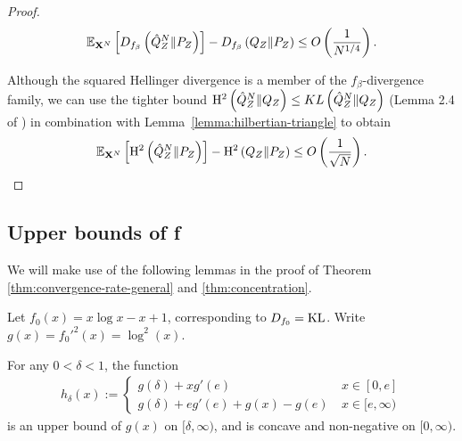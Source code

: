\begin{proof}
\begin{align*}
    \mathbb{E}_{\mathbf{X}^N}\left[D_{f_\beta}\left( \hat{Q}^N_Z \| P_Z\right)\right] - D_{f_\beta}\left( Q_{Z} \| P_Z\right) \leq O\left(\frac{1}{N^{1/4}}\right).
\end{align*}

Although the squared Hellinger divergence is a member of the $f_\beta$-divergence family, we can use the tighter bound $\mathrm{H}^2\left( \hat{Q}^N_Z \| Q_Z\right) \leq KL\left( \hat{Q}^N_Z \| Q_Z\right)$ (Lemma 2.4 of \cite{tsybakov2009}) in combination with Lemma~\ref{lemma:hilbertian-triangle} to obtain
\begin{align*}
    \mathbb{E}_{\mathbf{X}^N}\left[\mathrm{H}^2\left( \hat{Q}^N_Z \| P_Z\right)\right] - \mathrm{H}^2\left( Q_{Z} \| P_Z\right) \leq O\left(\frac{1}{\sqrt{N}}\right).
\end{align*}
\end{proof}





\subsection{Upper bounds of f}\label{appendix:subsubsec:f-upper-bounds}

We will make use of the following lemmas in the proof of Theorem \ref{thm:convergence-rate-general} and \ref{thm:concentration}.

\begin{lemma}\label{lemma:concave-upper-bound-kl} 
Let $f_0(x)=x\log x - x +1$, corresponding to $D_{f_0} = \mathrm{KL}$.
Write $g(x) = f_0'^2(x) = \log^2(x)$.

For any $0< \delta < 1$, the function
\begin{align*}
    h_{\delta}(x) := \begin{cases} 
    g(\delta) + x g'(e) & \: x \in [0, e]\\
    g(\delta) + e g'(e) + g(x) - g(e) & \: x \in [e, \infty)
    \end{cases}
\end{align*}
is an upper bound of $g(x)$ on $[\delta, \infty)$, and is concave and non-negative on $[0, \infty)$.
\end{lemma}


